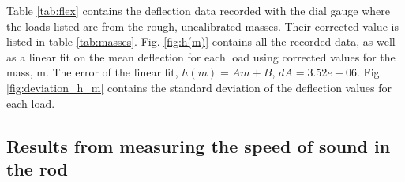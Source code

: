 \documentclass[11pt,a4paper]{article}
\begin{document}
  Table \ref{tab:flex} contains the deflection data recorded with the dial gauge where the loads listed are from the rough, uncalibrated masses. Their corrected value is listed in table \ref{tab:masses}. 
  \newline
  \newline
  Fig. \ref{fig:h(m)} contains all the recorded data, as well as a linear fit on the mean deflection for each load using corrected values for the mass, m. The error of the linear fit, $h(m) = Am + B$, $dA = 3.52e-06$. Fig. \ref{fig:deviation_h_m} contains the standard deviation of the deflection values for each load.

  \subsection{Results from measuring the speed of sound in the rod}
\end{document}
